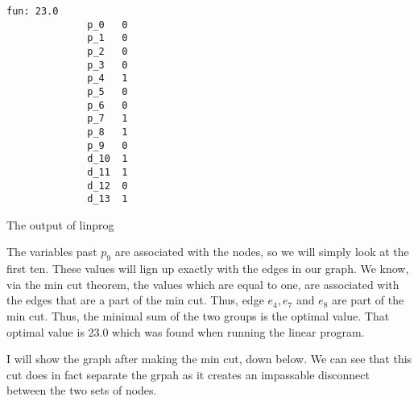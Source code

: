 \documentclass[11pt]{article}
\begin{document}
    \begin{minipage}[t]{.3\linewidth}
    \begin{lstlisting}[basicstyle=\small, gobble=12]
            fun: 23.0
              p_0 	0
              p_1 	0
              p_2 	0
              p_3 	0
              p_4 	1
              p_5 	0
              p_6 	0
              p_7 	1
              p_8 	1
              p_9 	0
              d_10 	1
              d_11 	1
              d_12 	0
              d_13 	1
        \end{lstlisting}
        The output of linprog
    \end{minipage} \hfill \vline \hfill%
    \begin{minipage}[t]{.65\linewidth}
        The variables past $p_9$ are associated with the nodes, so we will 
        simply look at the first ten. These values will lign up exactly with
        the edges in our graph. We know, via the min cut theorem, the 
        values which are equal to one, are associated with the
        edges that are a part of the min cut. Thus, edge $e_4, e_7$ and $e_8$
        are part of the min cut. Thus, the minimal sum of the two groups is the
        optimal value. That optimal value is 23.0 which was found when running
        the linear program.
        
        \medskip

        I will show the graph after making the min cut, down below. We can see
        that this cut does in fact separate the grpah as it creates an
        impassable disconnect between the two sets of nodes.
    \end{minipage}

    \vspace{2cm}

    \begin{center}
    \end{center}

 
\end{document}
